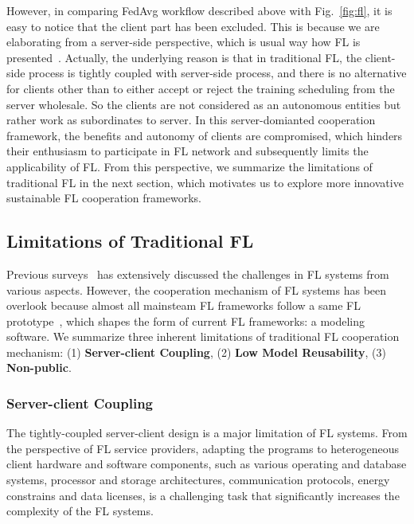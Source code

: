 However, in comparing FedAvg workflow described above with Fig.~\ref{fig:fl}, it is easy to notice that the client part has been excluded.
This is because we are elaborating from a server-side perspective, which is usual way how FL is presented~\cite{mcmahan2017communication, li2021ditto, caldas2018leaf}.
Actually, the underlying reason is that in traditional FL, the client-side process is tightly coupled with server-side process, and there is no alternative for clients other than to either accept or reject the training scheduling from the server wholesale.
So the clients are not considered as an autonomous entities but rather work as subordinates to server.
In this server-domianted cooperation framework, the benefits and autonomy of clients are compromised, which hinders their enthusiasm to participate in FL network and subsequently limits the applicability of FL.
From this perspective, we summarize the limitations of traditional FL in the next section, which motivates us to explore more innovative sustainable FL cooperation frameworks.

\subsection{Limitations of Traditional FL}\label{sec:limitations_FL}
Previous surveys~\cite{kairouz2021advances, zhang2022federated, alazab2021federated, nguyen2021federated, zhu2022blockchain, li2020federated, yang2019federated, tan2022towards} has extensively discussed the challenges in FL systems from various aspects.
However, the cooperation mechanism of FL systems has been overlook because almost all mainsteam FL frameworks follow a same FL prototype~\cite{mcmahan2017communication}, which shapes the form of current FL frameworks: a modeling software.
We summarize three inherent limitations of traditional FL cooperation mechanism: (1) \textbf{Server-client Coupling}, (2) \textbf{Low Model Reusability}, (3) \textbf{Non-public}.

\subsubsection{Server-client Coupling} 
The tightly-coupled server-client design is a major limitation of FL systems. From the perspective of FL service providers, adapting the programs to heterogeneous client hardware and software components, such as various operating and database systems, processor and storage architectures, communication protocols, energy constrains and data licenses, is a challenging task that significantly increases the complexity of the FL systems. 
    
